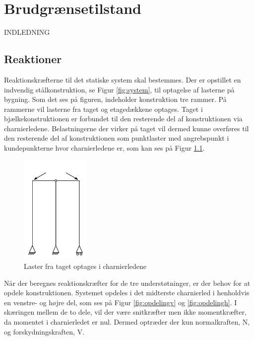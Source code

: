 \chapter{Brudgrænsetilstand}
INDLEDNING

\section{Reaktioner}
Reaktionskræfterne til det statiske system skal bestemmes. Der er opstillet en indvendig stålkonstruktion, se Figur \ref{fig:system}, til optagelse af lasterne på bygning. Som det ses på figuren, indeholder konstruktion tre rammer. På rammerne vil lasterne fra taget og etagedækkene optages. Taget i bjælkekonstruktionen er forbundet til den resterende del af konstruktionen via charnierledene. Belastningerne der virker på taget vil dermed kunne overføres til den resterende del af konstruktionen som punktlaster med angrebspunkt i kundepunkterne hvor charnierledene er, som kan ses på Figur \ref{fig:del2}. 

\begin{figure}[htbp]
	\centering
	\includegraphics[width=0.3\textwidth]{billeder/delto.png}
	\caption{Laster fra taget optages i charnierledene}
	\label{fig:del2}
\end{figure}

Når der beregnes reaktionskræfter for de tre understøtninger, er der behov for at opdele konstruktionen. Systemet opdeles i det midterste charnierled i henholdvis en venstre- og højre del, som ses på Figur \ref{fig:opdelingv} og \ref{fig:opdelingh}. I skæringen mellem de to dele, vil der være snitkræfter men ikke momentkræfter, da momentet i charnierledet er nul. Dermed optræder der kun normalkraften, N, og forskydningskraften, V.

